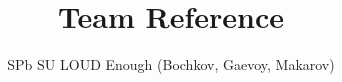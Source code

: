 \documentclass[11pt,a4paper,russian,landscape,twocolumn]{article}
\title{Team Reference}
\author{SPb SU LOUD Enough (Bochkov, Gaevoy, Makarov)}
\def\sqgrid{
	\newpage

	\begin{figure} \centering \tikz{
			\foreach \x in {0,...,50} { %
				\draw[color=gray,opacity=0.45] (0, 0.5 * \x cm) -- (17, 0.5 * \x cm);
				}
				\foreach \x in {0,...,34} { %
					\draw[color=gray,opacity=0.45] (0.5 * \x cm, 0) -- (0.5 * \x cm, 25);
					}
	} \end{figure}
}
\def\dotgrid{
	\newpage

	\begin{figure} \centering \tikz{
			\foreach \x in {0,...,50} {
				\foreach \y in {0,...,34} {
					\fill[fill=gray,opacity=0.45] (0.5 * \y cm, 0.5 * \x cm)
					node{\textcolor{gray}{.}};
					};
					}
	} \end{figure}
}
\begin{document}

\tableofcontents

\newpage

\newcommand{\code}{code/formatted}




\end{document}
